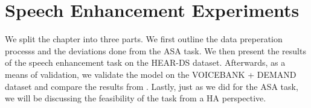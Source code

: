 \documentclass[logo,bsc,singlespacing,parskip,online]{infthesis}
\begin{document}

\chapter{Speech Enhancement Experiments}
We split the chapter into three parts. We first outline the data preperation processs 
and the deviations done from the ASA task. We then present the results of the speech 
enhancement task on the HEAR-DS dataset. Afterwards, as a means of validation, we 
validate the model on the VOICEBANK + DEMAND dataset and compare the results from 
\citet{kim_specmix_2021}. Lastly, just as we did for the ASA task, we will be 
discussing the feasibility of the task from a HA perspective.
\end{document}
